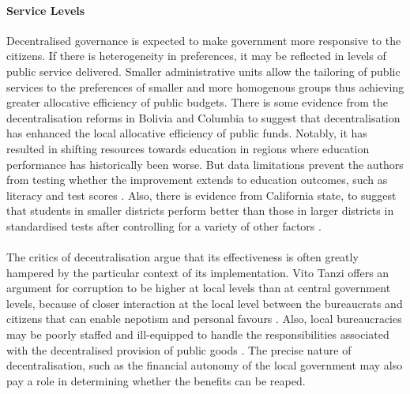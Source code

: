 \documentclass[12pt, a4paper]{article}
\begin{document}
\paragraph{Service Levels} Decentralised governance is expected to make government more responsive to the citizens. If there is heterogeneity in preferences, it may be reflected in levels of public service delivered. Smaller administrative units allow the tailoring of public services to the preferences of smaller and more homogenous groups thus achieving greater allocative efficiency of public budgets. %
There is some evidence from the decentralisation reforms in Bolivia and Columbia to suggest that decentralisation has enhanced the local allocative efficiency of public funds. Notably, it has resulted in shifting resources towards education in regions where education performance has historically been worse. But data limitations prevent the authors from testing whether the improvement extends to education outcomes, such as literacy and test scores \parencite{faguet2008decentralization}. Also, there is evidence from California state, to suggest that students in smaller districts perform better than those in larger districts in standardised tests after controlling for a variety of other factors \parencite{driscoll2003school}.

\paragraph{} The critics of decentralisation argue that its effectiveness is often greatly hampered by the particular context of its implementation. Vito Tanzi offers an argument for corruption to be higher at local levels than at central government levels, because of closer interaction at the local level between the bureaucrats and citizens that can enable nepotism and personal favours \parencite{tanzi1996macroeconomic}. Also, local bureaucracies may be poorly staffed and ill-equipped to handle the responsibilities associated with the decentralised provision of public goods \parencite{prud1995dangers}. The precise nature of decentralisation, such as the financial autonomy of the local government may also pay a role in determining whether the benefits can be reaped. 
	
\end{document}
